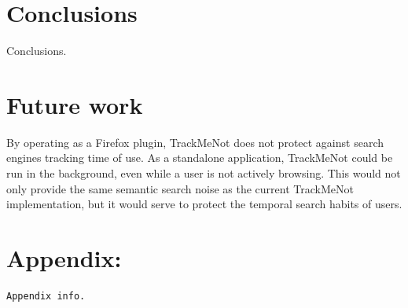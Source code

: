 \documentclass[11pt]{article}
\begin{document}
\begin{multicols}{2}
\section{Conclusions}
\label{sec:conc}
Conclusions.

\section{Future work}
\label{sec:future}
By operating as a Firefox plugin, TrackMeNot does not protect against search engines tracking time of use. As a standalone application, TrackMeNot could be run in the background, even while a user is not actively browsing. This would not only provide the same semantic search noise as the current TrackMeNot implementation, but it would serve to protect the temporal search habits of users.





\end{multicols}
\newpage
\begin{appendix} \label{appendix}
\section*{Appendix:}
{\tiny
\begin{verbatim}
Appendix info.
\end{verbatim}
}
\end{appendix}
\end{document}
